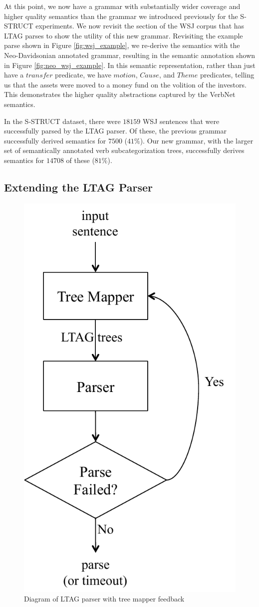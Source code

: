 \documentclass[11pt,a4paper]{article}
\begin{document}
At this point, we now have a grammar with substantially wider coverage and higher quality semantics than the grammar we introduced previously for the S-STRUCT experiments. We now revisit the section of the WSJ corpus that has LTAG parses to show the utility of this new grammar. Revisiting the example parse shown in Figure \ref{fig:wsj_example}, we re-derive the semantics with the Neo-Davidsonian annotated grammar, resulting in the semantic annotation shown in Figure \ref{fig:neo_wsj_example}. In this semantic representation, rather than just have a $transfer$ predicate, we have $motion$, $Cause$, and $Theme$ predicates, telling us that the assets were moved to a money fund on the volition of the investors. This demonstrates the higher quality abstractions captured by the VerbNet semantics.

In the S-STRUCT dataset, there were $18159$ WSJ sentences that were successfully parsed by the LTAG parser. Of these, the previous grammar successfully derived semantics for $7500$ ($41\%$). Our new grammar, with the larger set of semantically annotated verb subcategorization trees, successfully derives semantics for $14708$ of these ($81\%$). 

\subsection{Extending the LTAG Parser}

\begin{figure}[h]
\begin{centering}
    \includegraphics[width= 0.4\linewidth ]{resources/ch5_resources/tree_mapper_diagram.pdf}
    \caption{Diagram of LTAG parser with tree mapper feedback}
    \label{fig:tree_mapper_diagram}
\end{centering}
\end{figure}
\end{document}
